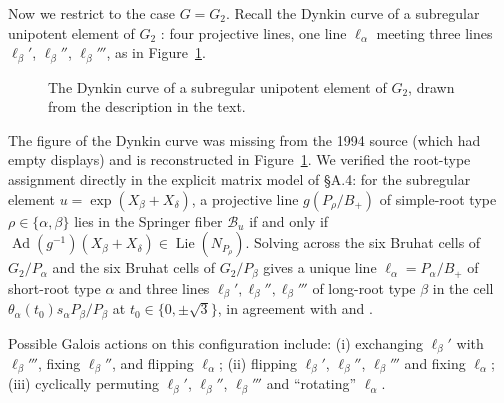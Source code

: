 \documentclass[12pt,letterpaper]{amsart}
\theoremstyle{plain}
\theoremstyle{definition}
\theoremstyle{remark}
\theoremstyle{definition}
\DeclareMathOperator{\Lie}{Lie}
\DeclareMathOperator{\Ad}{Ad}
\begin{document}
Now we restrict to the case $G=G_2$.
Recall the Dynkin curve of a subregular unipotent element of $G_2$
\cite{St74}: four projective lines, one line $\ell_\alpha$ meeting three
lines $\ell_\beta'$, $\ell_\beta''$, $\ell_\beta'''$, as in Figure~\ref{fig:dynkin}.

\begin{figure}[ht]
\centering
{}
\caption{The Dynkin curve of a subregular unipotent element of $G_2$, drawn
from the description in the text.}\label{fig:dynkin}
\end{figure}

\begin{rem26}\label{rem:dynkin}
The figure of the Dynkin curve was missing from the 1994 source (which had
empty displays) and is reconstructed in Figure~\ref{fig:dynkin}. We verified
the root-type assignment directly in the explicit matrix model of \S A.4: for
the subregular element $u=\exp(X_\beta+X_\delta)$, a projective line
$g(P_\rho/B_+)$ of simple-root type $\rho\in\{\alpha,\beta\}$ lies in the
Springer fiber ${\mathcal B}_u$ if and only if
$\Ad(g^{-1})(X_\beta+X_\delta)\in\Lie(N_{P_\rho})$. Solving across the six
Bruhat cells of $G_2/P_\alpha$ and the six Bruhat cells of $G_2/P_\beta$ gives
a unique line $\ell_\alpha=P_\alpha/B_+$ of short-root type $\alpha$ and three
lines $\ell_\beta',\ell_\beta'',\ell_\beta'''$ of long-root type $\beta$ in the
cell $\theta_\alpha(t_0)s_\alpha P_\beta/P_\beta$ at $t_0\in\{0,\pm\sqrt{3}\}$,
in agreement with \cite[\S3.10]{St74} and \cite[\S6.2]{Sl80}.
\end{rem26}

Possible Galois actions on this configuration include:
(i) exchanging $\ell_\beta'$ with $\ell_\beta'''$, fixing
$\ell_\beta''$, and flipping $\ell_\alpha$;
(ii) flipping $\ell_\beta'$, $\ell_\beta''$, $\ell_\beta'''$
and fixing $\ell_\alpha$;
(iii) cyclically permuting $\ell_\beta'$, $\ell_\beta''$, $\ell_\beta'''$
and ``rotating'' $\ell_\alpha$.
\end{document}
